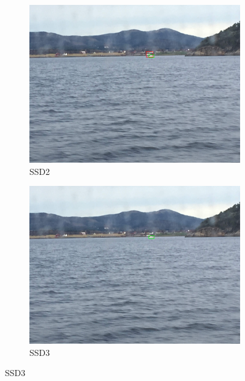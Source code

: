 \begin{figure}[h!]
\begin{subfigure}{.5\textwidth}
  \centering
  \includegraphics[width=0.8\linewidth]{results/case_buildings/ssdtrf/ssd2/2better/IMG_2459.jpg}
  \caption{SSD2}
\end{subfigure}%
\begin{subfigure}{.5\textwidth}
  \centering
  \includegraphics[width=.8\linewidth]{results/case_buildings/ssdtrf/ssd3/2better/IMG_2459.jpg}
  \caption{SSD3}
\end{subfigure}


\end{figure}

